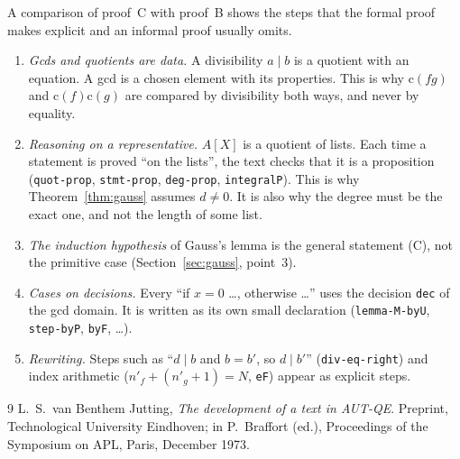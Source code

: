 \documentclass[11pt]{amsart}
\theoremstyle{definition}
\theoremstyle{remark}
\newcommand{\nm}[1]{\textup{\texttt{#1}}}
\newcommand{\cont}{\mathrm{c}}
\begin{document}
A comparison of proof~C with proof~B shows the steps that the formal
proof makes explicit and an informal proof usually omits.
\begin{enumerate}
\item \emph{Gcds and quotients are data.} A divisibility $a\mid b$ is a
  quotient with an equation. A gcd is a chosen element with its
  properties. This is why $\cont(fg)$ and $\cont(f)\cont(g)$ are compared
  by divisibility both ways, and never by equality.
\item \emph{Reasoning on a representative.} $A[X]$ is a quotient of lists.
  Each time a statement is proved ``on the lists'', the text checks that
  it is a proposition (\nm{quot-prop}, \nm{stmt-prop}, \nm{deg-prop},
  \nm{integralP}). This is why Theorem~\ref{thm:gauss} assumes $d\neq0$.
  It is also why the degree must be the exact one, and not the length of
  some list.
\item \emph{The induction hypothesis} of Gauss's lemma is the general
  statement (C), not the primitive case (Section~\ref{sec:gauss},
  point~3).
\item \emph{Cases on decisions.} Every ``if $x=0$ \dots, otherwise
  \dots'' uses the decision \nm{dec} of the gcd domain. It is written as
  its own small declaration (\nm{lemma-M-byU}, \nm{step-byP},
  \nm{byF}, \dots).
\item \emph{Rewriting.} Steps such as ``$d\mid b$ and $b=b'$, so
  $d\mid b'$'' (\nm{div-eq-right}) and index arithmetic ($n'_f+(n'_g+1)=N$,
  \nm{eF}) appear as explicit steps.
\end{enumerate}

\begin{thebibliography}{9}
 L.~S.~van Benthem Jutting, \emph{The development of a
  text in AUT-QE}. Preprint, Technological University Eindhoven; in
  P.~Braffort (ed.), Proceedings of the Symposium on APL, Paris,
  December 1973.
\end{thebibliography}
\end{document}
